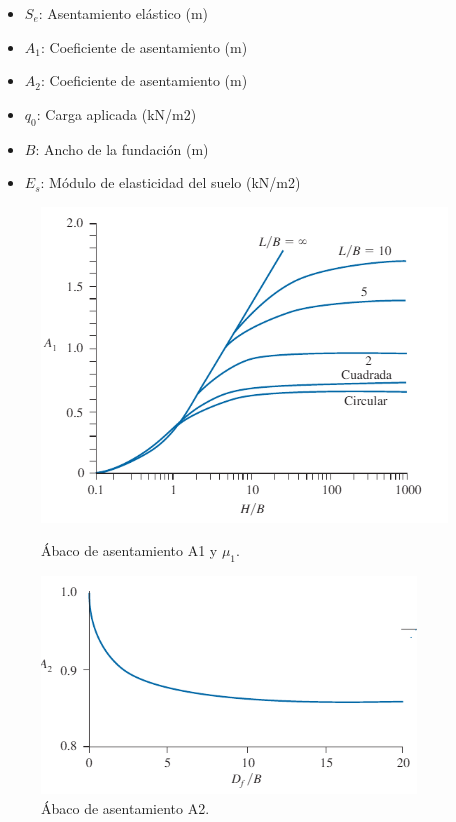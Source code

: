 \documentclass{article} %
\begin{document}
\begin{itemize}
    \item $S_e$: Asentamiento elástico (m)
    \item $A_1$: Coeficiente de asentamiento (m)
    \item $A_2$: Coeficiente de asentamiento (m)
    \item $q_0$: Carga aplicada (kN/m2)
    \item $B$: Ancho de la fundación (m)
    \item $E_s$: Módulo de elasticidad del suelo (kN/m2)
\end{itemize}
\newpage
\begin{figure}[h]
    \centering
    \begin{minipage}[b]{0.48\textwidth}
        \centering
        \includegraphics[width=\textwidth]{Graficos/asentamiento_2.PNG}
        \caption{Ábaco de asentamiento A1 y $\mu_1$.}
        \label{fig:asentamiento2}
    \end{minipage}
    \hfill
    \begin{minipage}[b]{0.48\textwidth}
        \centering
        \includegraphics[width=\textwidth]{Graficos/asentamiento_1.PNG}
        \caption{Ábaco de asentamiento A2.}
        \label{fig:asentamiento3}
    \end{minipage}
\end{figure}
\end{document}
